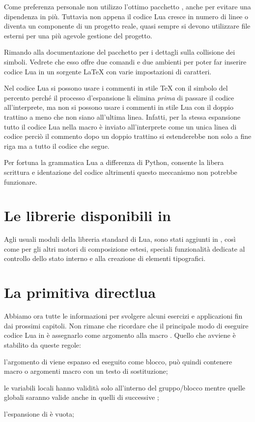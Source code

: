 Come preferenza personale non utilizzo l'ottimo pacchetto ,
anche per evitare una dipendenza in più. Tuttavia non appena il codice Lua
cresce in numero di linee o diventa un componente di un progetto reale, quasi
sempre si devono utilizzare file esterni per una più agevole gestione del
progetto.

Rimando alla documentazione del pacchetto  per i dettagli sulla
collisione dei simboli. Vedrete che esso offre due comandi e due ambienti per
poter far inserire codice Lua in un sorgente \LaTeX{} con varie impostazioni di
caratteri.

Nel codice Lua si possono usare i commenti in stile \TeX{} con il simbolo del
percento perché il processo d'espansione li elimina \emph{prima} di passare il
codice all'interprete, ma non si possono usare i commenti in stile Lua con il
doppio trattino a meno che non siano all'ultima linea. Infatti, per la stessa
espansione tutto il codice Lua nella macro  è inviato
all'interprete come un unica linea di codice perciò il commento dopo un doppio
trattino si estenderebbe non solo a fine riga ma a tutto il codice che segue.

Per fortuna la grammatica Lua a differenza di Python, consente la libera
scrittura e identazione del codice altrimenti questo meccanismo non potrebbe
funzionare.


\section{Le librerie disponibili in \LuaTeX}

Agli usuali moduli della libreria standard di Lua, sono stati aggiunti in
\LuaTeX{}, così come per gli altri motori di composizione estesi, speciali
funzionalità dedicate al controllo dello stato interno e alla creazione di
elementi tipografici.





\section{La primitiva directlua}

Abbiamo ora tutte le informazioni per svolgere alcuni esercizi e applicazioni
fin dai prossimi capitoli. Non rimane che ricordare che il principale modo di
eseguire codice Lua in \LuaTeX{} è assegnarlo come argomento alla macro
. Quello che avviene è stabilito da queste regole:
\begin{compactenumerate}
\item l'argomento di  viene espanso ed eseguito come blocco, può
quindi contenere macro o argomenti macro con un testo di sostituzione;

\item le variabili locali hanno validità solo all'interno del gruppo/blocco
mentre quelle globali saranno valide anche in quelli di successive
;

\item l'espansione di  è vuota;
\end{compactenumerate}


